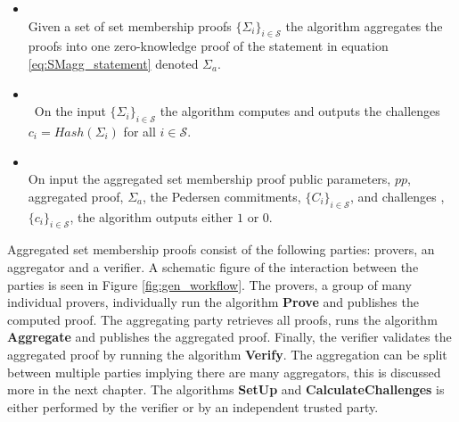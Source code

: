 \begin{Mydef}
\begin{itemize}
\item {} \\
Given a set of set membership proofs  $\{ \Sigma_{i}\}_{i\in\mathcal{S}}$ the algorithm aggregates the proofs into one zero-knowledge proof of the statement in equation \eqref{eq:SMagg_statement} denoted $\Sigma_a$. 

\item {}\\\
On the input $\{\Sigma_i\}_{i\in\mathcal{S}}$ the algorithm computes and outputs the challenges  $c_i = Hash(\Sigma_i)$ for all $i\in\mathcal{S}$.

\item{} \\
On input the aggregated set membership proof public parameters, $pp$, aggregated proof, $\Sigma_a$, the Pedersen commitments, $\{C_i\}_{i\in\mathcal{S}}$, and challenges ,$\{c_i\}_{i\in\mathcal{S}}$, the algorithm outputs either $1$ or $0$. 
\end{itemize}

\end{Mydef}
\vspace{10pt}

Aggregated set membership proofs consist of the following parties: provers, an aggregator and a verifier. A schematic figure of the interaction between the parties is seen in Figure \ref{fig:gen_workflow}. The provers, a group of many individual provers, individually run the algorithm \textbf{Prove} and publishes the computed proof. The aggregating party retrieves all proofs, runs the algorithm \textbf{Aggregate} and publishes the aggregated proof. Finally, the verifier validates the aggregated proof by running the algorithm \textbf{Verify}.  The aggregation can be split between multiple parties implying there are many aggregators, this is discussed more in the next chapter. The algorithms \textbf{SetUp} and \textbf{CalculateChallenges} is either performed by the verifier or by an independent trusted party.


